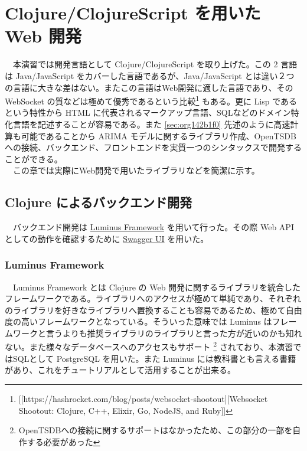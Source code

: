 \documentclass[dvipdfmx]{scrartcl}
\begin{document}
\section{Clojure/ClojureScript を用いた Web 開発}
\label{sec:org42f6338}
　本演習では開発言語として Clojure/ClojureScript を取り上げた。この 2 言語は Java/JavaScript をカバーした言語であるが、Java/JavaScript とは違い２つの言語に大きな差はない。またこの言語はWeb開発に適した言語であり、その WebSocket の質などは極めて優秀であるという比較\footnote{[[https://hashrocket.com/blog/posts/websocket-shootout][Websocket Shootout: Clojure, C++, Elixir, Go, NodeJS, and Ruby]]} もある。更に Lisp であるという特性から HTML に代表されるマークアップ言語、SQLなどのドメイン特化言語を記述することが容易である。また \ref{sec:org142b1f0} 先述のように高速計算も可能であることから ARIMA モデルに関するライブラリ作成、OpenTSDBへの接続、バックエンド、フロントエンドを実質一つのシンタックスで開発することができる。\\
　この章では実際にWeb開発で用いたライブラリなどを簡潔に示す。\\
\subsection{Clojure によるバックエンド開発}
\label{sec:orgd6571fa}
　バックエンド開発は \href{http://www.luminusweb.net/}{Luminus Framework} を用いて行った。その際 Web API としての動作を確認するために \href{https://swagger.io/swagger-ui/}{Swagger UI} を用いた。\\
\subsubsection{Luminus Framework}
\label{sec:orgc52b4ad}
　Luminus Framework とは Clojure の Web 開発に関するライブラリを統合したフレームワークである。ライブラリへのアクセスが極めて単純であり、それぞれのライブラリを好きなライブラリへ置換することも容易であるため、極めて自由度の高いフレームワークとなっている。そういった意味では Luminus はフレームワークと言うよりも推奨ライブラリのライブラリと言った方が近いのかも知れない。また様々なデータベースへのアクセスもサポート \footnote{OpenTSDBへの接続に関するサポートはなかったため、この部分の一部を自作する必要があった} されており、本演習ではSQLとして PostgreSQL を用いた。また Luminus には教科書とも言える書籍 \cite{luminus} があり、これをチュートリアルとして活用することが出来る。\\
\end{document}
